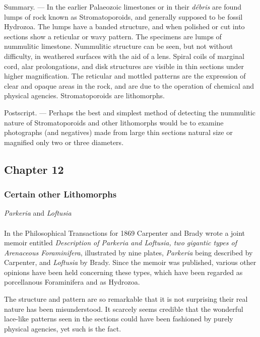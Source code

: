 \documentclass[a4paper, 12pt, oneside, landscape]{article}
\begin{document}
Summary. --- In the earlier Palaeozoic limestones or in their \emph{débris} are found lumps of rock known as Stromatoporoids, and generally supposed to be fossil Hydrozoa. The lumps have a banded structure, and when polished or cut into sections show a reticular or wavy pattern. The specimens are lumps of nummulitic limestone. Nummulitic structure can be seen, but not without difficulty, in weathered surfaces with the aid of a lens. Spiral coils of marginal cord, alar prolongations, and disk structures are visible in thin sections under higher magnification. The reticular and mottled patterns are the expression of clear and opaque areas in the rock, and are due to the operation of chemical and physical agencies. Stromatoporoids are lithomorphs.

Postscript. --- Perhaps the best and simplest method of detecting the nummulitic nature of Stromatoporoids and other lithomorphs would be to examine photographs (and negatives) made from large thin sections natural size or magnified only two or three diameters.
\clearpage
\subsection{Chapter 12}
\subsubsection{Certain other Lithomorphs}
\centerline{\emph{Parkeria} and \emph{Loftusia}}
\paragraph{}
In the Philosophical Transactions for 1869 Carpenter and Brady wrote a joint memoir entitled \emph{Description of \emph{Parkeria} and \emph{Loftusia}, two gigantic types of Arenaceous Foraminifera}, illustrated by nine plates, \emph{Parkeria} being described by Carpenter, and \emph{Loftusia} by Brady. Since the memoir was published, various other opinions have been held concerning these types, which have been regarded as porcellanous Foraminifera and as Hydrozoa.

The structure and pattern are so remarkable that it is not surprising their real nature has been misunderstood. It scarcely seems credible that the wonderful lace-like patterns seen in the sections could have been fashioned by purely physical agencies, yet such is the fact.
\end{document}
